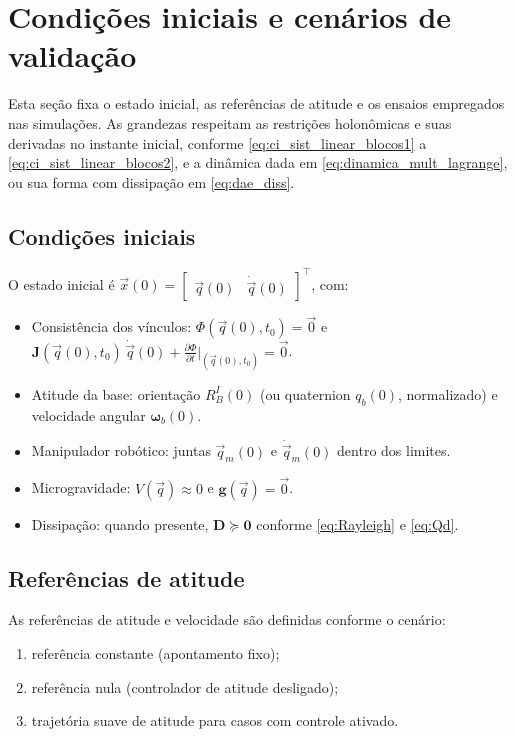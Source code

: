\section{Condições iniciais e cenários de validação}

Esta seção fixa o estado inicial, as referências de atitude e os ensaios empregados nas simulações.
As grandezas respeitam as restrições holonômicas e suas derivadas no instante inicial, conforme
\eqref{eq:ci_sist_linear_blocos1} a
\eqref{eq:ci_sist_linear_blocos2},
e a dinâmica dada em
\eqref{eq:dinamica_mult_lagrange}, 
ou sua forma com dissipação em \eqref{eq:dae_diss}.

\subsection{Condições iniciais}
O estado inicial é
$\vec x(0)=\begin{bmatrix}\vec q(0) & \dot{\vec q}(0)\end{bmatrix}^{\!\top}$, com:
\begin{itemize}
\item Consistência dos vínculos: $\Phi(\vec q(0),t_0)=\vec 0$ e $\mathbf J(\vec q(0),t_0)\,\dot{\vec q}(0)+\tfrac{\partial\Phi}{\partial t}\big|_{(\vec q(0),t_0)}=\vec 0$.
\item Atitude da base: orientação $R_{B}^{I}(0)$ (ou quaternion $q_b(0)$, normalizado) e velocidade angular $\boldsymbol\omega_b(0)$.
\item Manipulador robótico: juntas $\vec q_m(0)$ e $\dot{\vec q}_m(0)$ dentro dos limites.
\item Microgravidade: $V(\vec q)\approx 0$ e $\mathbf g(\vec q)=\vec 0$.
\item Dissipação: quando presente, $\mathbf D\succeq \mathbf 0$ conforme
\eqref{eq:Rayleigh} e \eqref{eq:Qd}.
\end{itemize}

\subsection{Referências de atitude}
As referências de atitude e velocidade são definidas conforme o cenário:
\begin{enumerate}[label=(\roman*)]
\item referência constante (apontamento fixo);
\item referência nula (controlador de atitude desligado);
\item trajetória suave de atitude para casos com controle ativado.
\end{enumerate}


